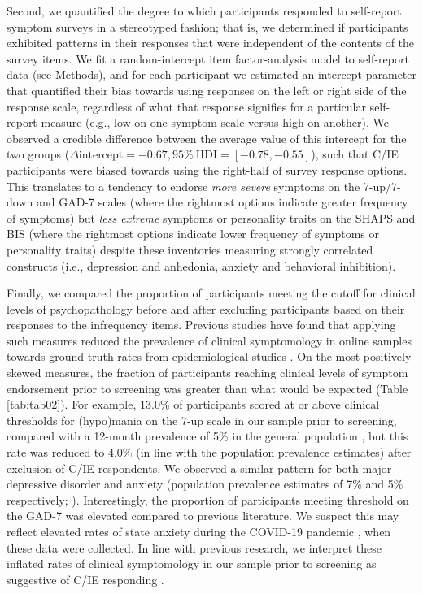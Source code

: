 \documentclass[a4paper,notitlepage,12pt]{article}
\begin{document}
Second, we quantified the degree to which participants responded to self-report symptom surveys in a stereotyped fashion; that is, we determined if participants exhibited patterns in their responses that were independent of the contents of the survey items. We fit a random-intercept item factor-analysis model \cite{maydeu2006random} to self-report data (see Methods), and for each participant we estimated an intercept parameter that quantified their bias towards using responses on the left or right side of the response scale, regardless of what that response signifies for a particular self-report measure (e.g., low on one symptom scale versus high on another). We observed a credible difference between the average value of this intercept for the two groups ($\Delta \text{intercept} = -0.67, 95\% \ \text{HDI} = [-0.78, -0.55]$), such that C/IE participants were biased towards using the right-half of survey response options. This translates to a tendency to endorse \emph{more severe} symptoms on the 7-up/7-down and GAD-7 scales (where the rightmost options indicate greater frequency of symptoms) but \emph{less extreme} symptoms or personality traits on the SHAPS and BIS (where the rightmost options indicate lower frequency of symptoms or personality traits) despite these inventories measuring strongly correlated constructs (i.e., depression and anhedonia, anxiety and behavioral inhibition).

Finally, we compared the proportion of participants meeting the cutoff for clinical levels of psychopathology before and after excluding participants based on their responses to the infrequency items. Previous studies have found that applying such measures reduced the prevalence of clinical symptomology in online samples towards ground truth rates from epidemiological studies \cite{ophir2020turker}. On the most positively-skewed measures, the fraction of participants reaching clinical levels of symptom endorsement prior to screening was greater than what would be expected (Table \ref{tab:tab02}). For example, 13.0\% of participants scored at or above clinical thresholds for (hypo)mania on the 7-up scale in our sample prior to screening, compared with a 12-month prevalence of 5\% in the general population \cite{merikangas2007lifetime, merikangas2012true}, but this rate was reduced to 4.0\% (in line with the population prevalence estimates) after exclusion of C/IE respondents. We observed a similar pattern for both major depressive disorder and anxiety (population prevalence estimates of 7\% and 5\% respectively; \cite{kessler2012twelve, lowe2008validation, hinz2017psychometric}). Interestingly, the proportion of participants meeting threshold on the GAD-7 was elevated compared to previous literature. We suspect this may reflect elevated rates of state anxiety during the COVID-19 pandemic \cite{yarrington2021impact}, when these data were collected. In line with previous research, we interpret these inflated rates of clinical symptomology in our sample prior to screening as suggestive of C/IE responding \cite{ophir2020turker}.
\end{document}
